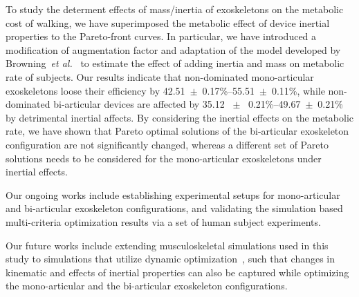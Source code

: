 \documentclass[10pt,letterpaper]{article}
\newcommand{\etal}{\textit{et al.}}
\begin{document}
To study the determent effects of  mass/inertia of exoskeletons on the metabolic cost of walking, we have superimposed the metabolic effect of device inertial properties to the Pareto-front curves. In particular, we have introduced a modification of augmentation factor and adaptation of the model developed by Browning~\etal~\cite{Browning2007} to estimate the effect of adding inertia and mass on metabolic rate of subjects. Our results indicate that non-dominated mono-articular exoskeletons loose their efficiency by 42.51~$\pm$~0.17\%--55.51~$\pm$~0.11\%, while non-dominated bi-articular devices are affected by 35.12 ~$\pm$~ 0.21\%--49.67~$\pm$~0.21\% by detrimental inertial affects. By considering the inertial effects on the metabolic rate, we have shown that Pareto optimal solutions of the bi-articular exoskeleton configuration are not significantly changed, whereas a different set of Pareto solutions needs to be considered for the mono-articular exoskeletons under inertial effects.



Our ongoing works include establishing experimental setups for mono-articular and bi-articular exoskeleton configurations, and validating the simulation based multi-criteria optimization results via a set of human subject experiments. %

Our future works include extending musculoskeletal simulations used in this study to  simulations that utilize dynamic optimization~\cite{Geijtenbeek2019,Dembia2019_Moco}, such that changes in kinematic and effects of inertial properties can also be captured while optimizing the mono-articular and the bi-articular exoskeleton configurations.
\end{document}
